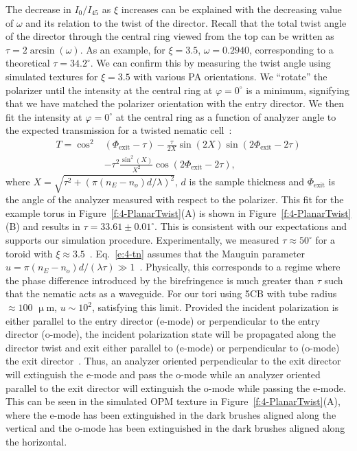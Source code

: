 The decrease in $I_0/I_{45}$ as $\xi$ increases can be explained with the decreasing value of $\omega$ and its relation to the twist of the director.
Recall that the total twist angle of the director through the central ring viewed from the top can be written as $\tau = 2 \arcsin (\omega)$.
As an example, for $\xi = 3.5$, $\omega = 0.2940$, corresponding to a theoretical $\tau = 34.2^{\circ}$.
We can confirm this by measuring the twist angle using simulated textures for $\xi=3.5$ with various PA orientations.
We ``rotate'' the polarizer until the intensity at the central ring at $\varphi=0^{\circ}$ is a minimum, signifying that we have matched the polarizer orientation with the entry director.
We then fit the intensity at $\varphi=0^{\circ}$ at the central ring as a function of analyzer angle to the expected transmission for a twisted nematic cell~\cite{RN232}:
\begin{align}\label{e:4-tn}
T = \cos ^2&(\Phi_{\textrm{exit}}-\tau)-\frac{\tau}{2 X}\sin(2X)\sin(2\Phi_{\textrm{exit}}-2\tau)\nonumber \\
&-\tau ^2\frac{\sin ^2 (X)}{X^2}\cos(2\Phi_{\textrm{exit}}-2\tau),
\end{align}
where $X = \sqrt{\tau^2+(\pi(n_E-n_o)d/\lambda)^2}$, $d$ is the sample thickness and $\Phi_\textrm{exit}$ is the angle of the analyzer measured with respect to the polarizer.
This fit for the example torus in Figure~\ref{f:4-PlanarTwist}(A) is shown in Figure~\ref{f:4-PlanarTwist}(B) and results in $\tau=33.61 \pm 0.01^{\circ}$.
This is consistent with our expectations and supports our simulation procedure.
Experimentally, we measured $\tau \approx 50^{\circ}$ for a toroid with $\xi \approx 3.5$~\cite{RN24}. Eq.~\ref{e:4-tn} assumes that the Mauguin parameter $u =  \pi (n_E-n_o) d /(\lambda \tau) \gg 1$~\cite{RN232}.
 Physically, this corresponds to a regime where the phase difference introduced by the birefringence is much greater than $\tau$ such that the nematic acts as a waveguide.
For our tori using 5CB with tube radius $\approx 100$ $\upmu$m, $u\sim 10^{2}$, satisfying this limit.
Provided the incident polarization is either parallel to the entry director (e-mode) or perpendicular to the entry director (o-mode), the incident polarization state will be propagated along the director twist and exit either parallel to (e-mode) or perpendicular to (o-mode) the exit director~\cite{RN232}.
Thus, an analyzer oriented perpendicular to the exit director will extinguish the e-mode and pass the o-mode while an analyzer oriented parallel to the exit director will extinguish the o-mode while passing the e-mode.
This can be seen in the simulated OPM texture in Figure~\ref{f:4-PlanarTwist}(A), where the e-mode has been extinguished in the dark brushes aligned along the vertical and the o-mode has been extinguished in the dark brushes aligned along the horizontal.


